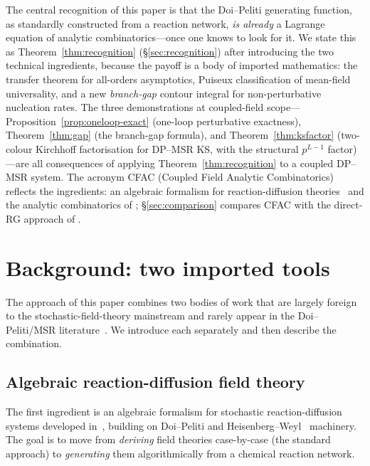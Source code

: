 \documentclass[11pt,a4paper]{article}
\theoremstyle{plain}
\begin{document}
The central recognition of this paper is that the Doi--Peliti
generating function, as standardly constructed from a reaction
network, \emph{is already} a Lagrange equation of analytic
combinatorics---once one knows to look for it.  We state this as
Theorem~\ref{thm:recognition} (\S\ref{sec:recognition}) after
introducing the two technical ingredients, because the payoff is
a body of imported mathematics: the transfer theorem for
all-orders asymptotics, Puiseux classification of mean-field
universality, and a new \emph{branch-gap} contour integral for
non-perturbative nucleation rates.  The three demonstrations at
coupled-field scope---Proposition~\ref{prop:oneloop-exact}
(one-loop perturbative exactness), Theorem~\ref{thm:gap} (the
branch-gap formula), and Theorem~\ref{thm:ksfactor} (two-colour
Kirchhoff factorisation for DP--MSR KS, with the structural
$p^{L-1}$ factor)---are all consequences of
applying Theorem~\ref{thm:recognition} to a coupled DP--MSR
system.  The acronym CFAC (Coupled Field Analytic Combinatorics)
reflects the ingredients: an algebraic formalism for
reaction-diffusion theories~\citep{Amarteifio2019Thesis} and the
analytic combinatorics of \citet{FlajoletSedgewick};
\S\ref{sec:comparison} compares CFAC with the direct-RG approach
of \citet{PruessnerGarciaMillan2025}.

\section{Background: two imported tools}
\label{sec:background}

The approach of this paper combines two bodies of work that are
largely foreign to the stochastic-field-theory mainstream and
rarely appear in the Doi--Peliti/MSR
literature~\cite{PruessnerGarciaMillan2025,Bothe2023,Tauber}.  We
introduce each separately and then describe the combination.

\subsection{Algebraic reaction-diffusion field theory}
\label{sec:algebraic}

The first ingredient is an algebraic formalism for stochastic
reaction-diffusion systems developed
in~\cite{Amarteifio2019Thesis}, building on Doi--Peliti
\cite{Doi1976,Peliti1985} and
Heisenberg--Weyl~\cite{Tauber} machinery.  The goal is to move
from \emph{deriving} field theories case-by-case (the standard
approach) to \emph{generating} them algorithmically from a
chemical reaction network.
\end{document}
